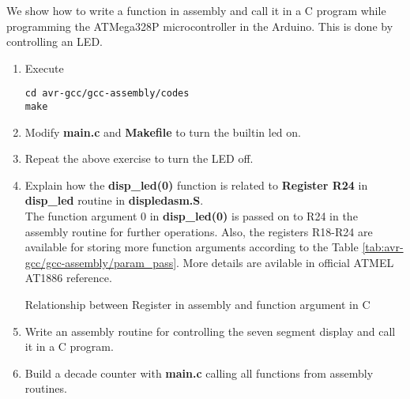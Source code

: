 We show how to write a function in assembly and call it in a C program while programming the ATMega328P microcontroller in the Arduino.  This is done by controlling an LED. 
%
\begin{enumerate}[label=\arabic*.,ref=\theenumi]
\item Execute 
\begin{lstlisting}
cd avr-gcc/gcc-assembly/codes
make
\end{lstlisting}
\item Modify \textbf{main.c} and \textbf{Makefile} to turn the builtin led on.
\item Repeat the above exercise to turn the LED off.
\item Explain how the \textbf{disp\_led(0)} function is related to \textbf{Register R24} in \textbf{disp\_led} routine in \textbf{displedasm.S}.
	\\
\solution The function argument 0 in \textbf{disp\_led(0)} is passed on to R24 in the assembly routine for further operations.  Also, the registers R18-R24 are available for storing more function arguments according to the Table \ref{tab:avr-gcc/gcc-assembly/param_pass}.  More details are avilable in official ATMEL AT1886 reference.

\begin{table}[H]
\centering
	
\caption{Relationship between Register in assembly and function argument in C}
\label{tab:avr-gcc/gcc-assembly/param_pass}
\end{table}

\item Write an assembly routine for controlling the seven segment display and call it in a C program.
\item Build a decade counter with \textbf{main.c} calling all functions from assembly routines.
\end{enumerate}



